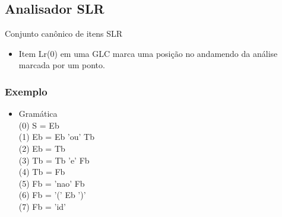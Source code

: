 \documentclass[11pt]{article}
\begin{document}
\subsection{Analisador SLR}
\label{sec:orgbd89409}
Conjunto canônico de itens SLR
\begin{itemize}
\item Item Lr(0) em uma GLC marca uma posição no andamendo da análise
marcada por um ponto.
\end{itemize}

\subsubsection{Exemplo}
\label{sec:org92cf842}
\begin{itemize}
\item Gramática\\
(0) S = Eb\\
(1) Eb = Eb 'ou' Tb\\
(2) Eb = Tb\\
(3) Tb = Tb 'e' Fb\\
(4) Tb = Fb\\
(5) Fb = 'nao' Fb\\
(6) Fb = '(' Eb ')'\\
(7) Fb = 'id'\\
\end{itemize}
\end{document}
